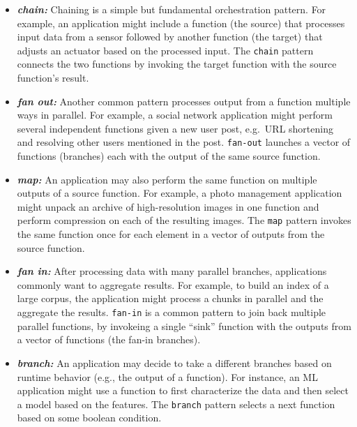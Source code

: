 \begin{itemize}
    \item \textit{\textbf{chain:} }
    Chaining is a simple but fundamental orchestration pattern. For example,
    an application might include a function (the source) that processes input
    data from a sensor followed by another function (the target) that adjusts
    an actuator based on the processed input. The \texttt{chain} pattern
    connects the two functions by invoking the target function with the source
    function's result.

    \item \textit{\textbf{fan out:}} 
    Another common pattern processes output from a function multiple
    ways in parallel. For example, a social network application might perform
    several independent functions given a new user post, e.g.\ URL
    shortening and resolving other users mentioned in the post. \texttt{fan-out}
launches a vector of functions (branches) each with the output of the same
source function.

	\item \textit{\textbf{map: }}
    An application may also perform the same function on multiple outputs of a
    source function. For example, a photo management application might unpack an
    archive of high-resolution images in one function and perform compression on
    each of the resulting images. The \texttt{map} pattern invokes the same
    function once for each element in a vector of outputs from the source
    function.

	\item \textit{\textbf{fan in:}}
    After processing data with many parallel branches, applications commonly
    want to aggregate results. For example, to build an index of a large
    corpus, the application might process a chunks in parallel and the
    aggregate the results. \texttt{fan-in} is a common pattern to join back
    multiple parallel functions, by invokeing a single ``sink'' function with
    the outputs from a vector of functions (the fan-in branches).

    \item \textit{\textbf{branch:}}
    An application may decide to take a different branches
    based on runtime behavior (e.g., the output of a function). For instance,
    an ML application might use a function to first characterize the data and
    then select a model based on the features. The \texttt{branch} pattern
    selects a next function based on some boolean condition.


\end{itemize}
